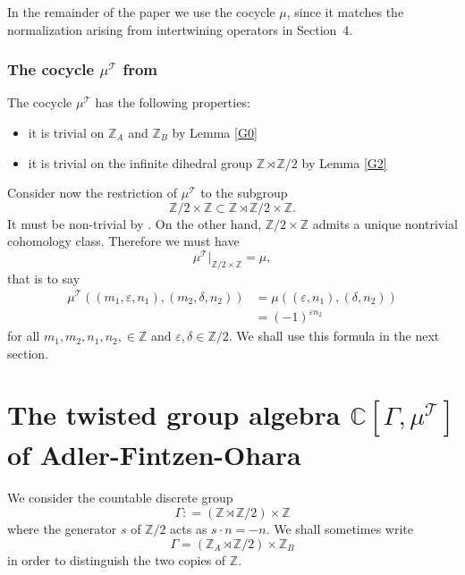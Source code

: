 \documentclass[11pt]{amsart}
\theoremstyle{remark}
\theoremstyle{definition}
\newcommand{\Z}{\mathbb{Z}}
\newcommand{\C}{\mathbb{C}}
\def\cT{\mathcal{T}}
\begin{document}

In the remainder of the paper we use the cocycle $\mu$, since it matches
the normalization arising from intertwining operators in Section~4.

\subsubsection{The cocycle  $\mu^{\mathcal{T}}$ from \cite{AFO}}   The cocycle $\mu^{\mathcal{T}}$ has the following properties:
\begin{itemize}
\item it is trivial on $\Z_A$ and $\Z_B$ by Lemma   \ref{G0}
\item  it is trivial on the infinite dihedral group $\Z \rtimes \Z/2$ by Lemma \ref{G2}
\end{itemize}

Consider now the restriction of $\mu^{\mathcal{T}}$ to the subgroup 
\[
\Z/2 \times \Z \subset \Z \rtimes \Z/2 \times \Z.   
\]
It must be non-trivial by \cite[Corollary 3.6]{AFO}.   On the other hand, $\Z/2 \times \Z$ admits a unique nontrivial cohomology class.   Therefore we must have
\[
\mu^{\mathcal{T}}|_{\Z/2 \times \Z} = \mu,
\]
that is to say
\begin{align*}
\mu^{\mathcal{T}}((m_1,\varepsilon, n_1), (m_2, \delta, n_2)) &= \mu((\varepsilon, n_1), (\delta, n_2))\\
& = (-1)^{\varepsilon n_2}
\end{align*}
for all $m_1, m_2, n_1, n_2,  \in \Z$ and $\varepsilon, \delta  \in \Z/2$.   We shall use this formula in the next section. 


\section{The twisted group algebra $\C[\Gamma, \mu^\cT]$ of Adler-Fintzen-Ohara}

We consider the countable discrete group
\[
\Gamma : = (\Z \rtimes \Z/2) \times \Z
\]
where the generator $s$ of $\Z/2$ acts as $s\cdot n = -n$.   We shall sometimes write
\[
\Gamma = (\Z_A \rtimes \Z/2) \times \Z_B
\]
in order to distinguish the two copies of $\Z$.   
\end{document}
